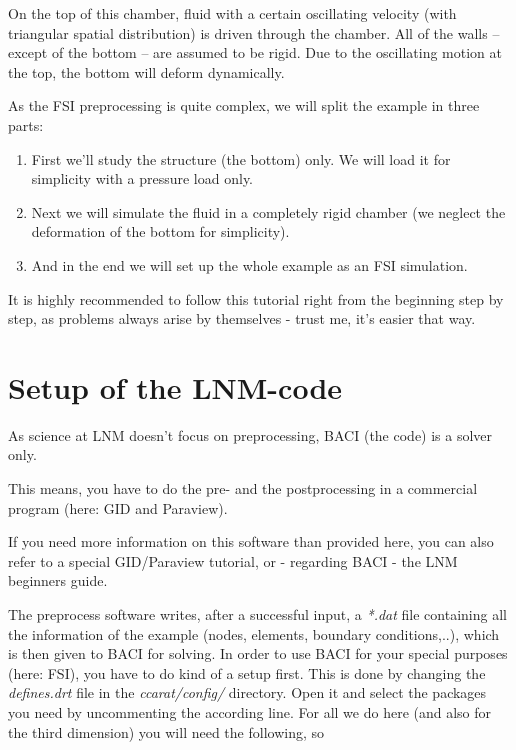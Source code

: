 On the top of this chamber, fluid with a certain oscillating velocity
(with triangular spatial distribution) is driven through the chamber. All
of the walls -- except of the bottom -- are assumed to be rigid. Due
to the oscillating motion at the top, the bottom will deform dynamically.

As the FSI preprocessing is quite complex, we will split the example
in three parts:

\begin{enumerate}
\item First we'll study the structure (the bottom) only. We will load it
for simplicity with a pressure load only.
\item Next we will simulate the fluid in a completely rigid chamber (we
neglect the deformation of the bottom for simplicity).
\item And in the end we will set up the whole example as an FSI simulation.
\end{enumerate}
It is highly recommended to follow this tutorial right from the beginning
step by step, as problems always arise by themselves - trust me, it's
easier that way.


\section{Setup of the LNM-code}

As science at LNM doesn't focus on preprocessing, BACI (the code)
is a solver only.

This means, you have to do the pre- and the postprocessing in a commercial
program (here: GID and Paraview). 

If you need more information on this software than provided here,
you can also refer to a special GID/Paraview tutorial, or - regarding
BACI - the LNM beginners guide.

The preprocess software writes, after a successful input, a \emph{{*}.dat}
file containing all the information of the example (nodes, elements,
boundary conditions,..), which is then given to BACI for solving.
In order to use BACI for your special purposes (here: FSI), you have
to do kind of a setup first. This is done by changing the \emph{defines.drt}
file in the \emph{ccarat/config/} directory. Open it and select the
packages you need by uncommenting the according line. For all we do
here (and also for the third dimension) you will need the following,
so

